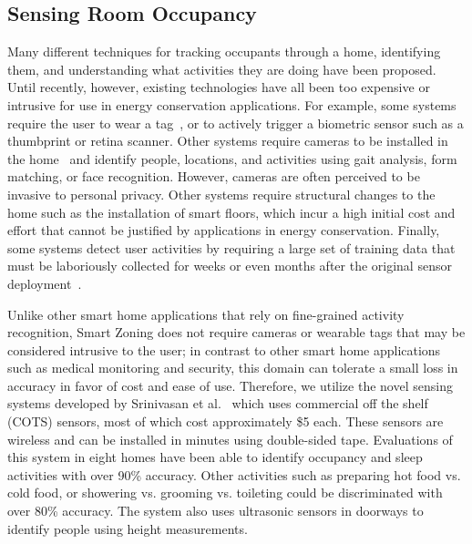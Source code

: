 \subsection{Sensing Room Occupancy}
Many different techniques for tracking occupants through a home, identifying
them, and understanding what activities they are doing have been proposed. Until
recently, however, existing technologies have all been too expensive or
intrusive for use in energy conservation applications. For example, some systems
require the user to wear a tag~\cite{smith2005rfid}, or to actively trigger a
biometric sensor such as a thumbprint or retina scanner. Other systems require
cameras to be installed in the home~\cite{nait4activity} and identify people,
locations, and activities using gait analysis, form matching, or face
recognition. However, cameras are often perceived to be invasive to personal
privacy. Other systems require structural changes to the home such as the
installation of smart floors, which incur a high initial cost and effort that
cannot be justified by applications in energy conservation. Finally, some
systems detect user activities by requiring a large set of training data that
must be laboriously collected for weeks or even months after the original sensor
deployment~\cite{wilson2005simultaneous}.

Unlike other smart home applications that rely on fine-grained activity
recognition, Smart Zoning does not require cameras or wearable tags that may be
considered intrusive to the user; in contrast to other smart home applications
such as medical monitoring and security, this domain can tolerate a small loss
in accuracy in favor of cost and ease of use. Therefore, we utilize the novel
sensing systems developed by Srinivasan et al.~\cite{srinivasan2008protecting,
srinivasan2010using} which uses commercial off the shelf (COTS) sensors, most of
which cost approximately \$5 each. These sensors are wireless and can be
installed in minutes using double-sided tape. Evaluations of this system in
eight homes have been able to identify occupancy and sleep activities with over
90\% accuracy. Other activities such as preparing hot food vs. cold food, or
showering vs. grooming vs. toileting could be discriminated with over 80\%
accuracy. The system also uses ultrasonic sensors in doorways to identify people
using height measurements.

